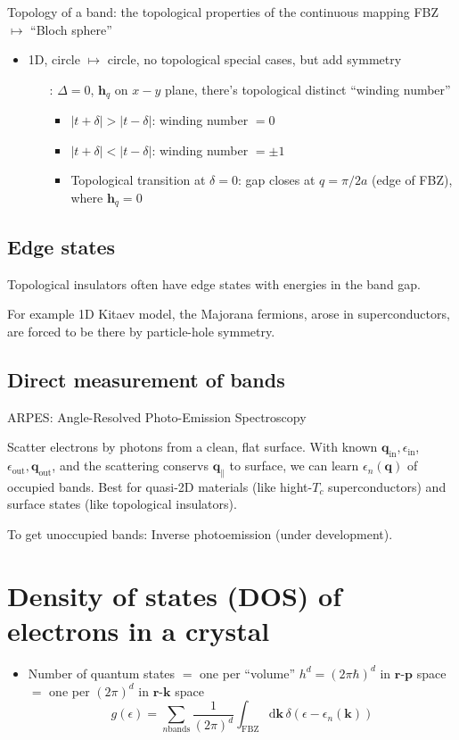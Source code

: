 \documentclass[11pt,letterpaper]{article}
\numberwithin{equation}{section} %
\renewcommand*{\vec}[1]{\bm{#1}}
\newcommand{\dif}{\mathrm d}
\begin{document}
Topology of a band: the topological properties of the continuous mapping FBZ
$\mapsto$ ``Bloch sphere''
\begin{itemize}
  \item 1D, circle $\mapsto$ circle, no topological special cases, but add
	  symmetry
	  \begin{itemize}
		  \item[:] $\Delta=0$, $\vec h_q$ on $x-y$ plane, there's topological
			distinct ``winding number''
			\begin{itemize}
			  \item $|t+\delta|>|t-\delta|$: winding number $=0$
			  \item $|t+\delta|<|t-\delta|$: winding number $=\pm 1$
			  \item Topological transition at $\delta=0$: gap closes at
				  $q=\pi/2a$ (edge of FBZ), where $\vec h_q = 0$
			\end{itemize}
	  \end{itemize}
\end{itemize}

\subsection{Edge states}
\label{sub:edge_states}
Topological insulators often have edge states with energies in the band gap.

For example 1D Kitaev model, the Majorana fermions, arose in superconductors,
are forced to be there by particle-hole symmetry.

\subsection{Direct measurement of bands}
\label{sub:direct_measurement_of_bans}
ARPES: Angle-Resolved Photo-Emission Spectroscopy

Scatter electrons by photons from a clean, flat surface. With known $\vec
q_{\mathrm{in}}, \epsilon_{\mathrm{in}}$, $\epsilon_{\mathrm{out}}, 
\vec q_{\mathrm{out}}$, and the scattering conservs $\vec q_\parallel$ to
surface, we can learn $\epsilon_n(\vec q)$ of occupied bands. Best for
quasi-2D materials (like hight-$T_c$ superconductors) and surface states
(like topological insulators).

To get unoccupied bands: Inverse photoemission (under development).

\section{Density of states (DOS) of electrons in a crystal}
\label{sec:density_of_states_dos_of_electrons_in_a_crystal}
\begin{itemize}
	\item Number of quantum states $=$ one per ``volume'' $h^d =
		(2\pi\hbar)^d$ in $\vec r$-$\vec p$ space $=$ one per $(2\pi)^d$ in
		$\vec r$-$\vec k$ space
		\begin{equation}
			g(\epsilon) = \sum_{n\mbox{bands}} \frac{1}{(2\pi)^d}
			\int_{\mbox{FBZ}}\dif\vec k\,\delta(\epsilon - \epsilon_n(\vec
			k))
		\end{equation}
\end{itemize}
\end{document}
